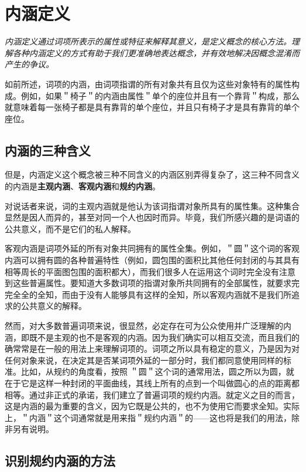 \section{内涵定义}

\begin{logicbox}[title=引言]
\textit{内涵定义通过词项所表示的属性或特征来解释其意义，是定义概念的核心方法。理解各种内涵定义的方式有助于我们更准确地表达概念，并有效地解决因概念混淆而产生的争议。}
\end{logicbox}

如前所述，词项的内涵，由词项指谓的所有对象共有且仅为这些对象特有的属性构成。例如，如果＂椅子＂的内涵由属性＂单个的座位并且有一个靠背＂构成，那么就意味着每一张椅子都是具有靠背的单个座位，并且只有椅子才是具有靠背的单个座位。

\subsection{内涵的三种含义}

但是，内涵定义这个概念被三种不同含义的内涵区别弄得复杂了，这三种不同含义的内涵是\textbf{主观内涵}、\textbf{客观内涵}和\textbf{规约内涵}。

对说话者来说，词的主观内涵就是他认为该词指谓对象所具有的属性集。这种集合显然是因人而异的，甚至对同一个人也因时而异。毕竟，我们所感兴趣的是词语的公共意义，而不是它们的私人解释。

客观内涵是词项外延的所有对象共同拥有的属性全集。例如，＂圆＂这个词的客观内涵可以拥有圆的各种普遍特性（例如，圆包围的面积比其他任何封闭的与其具有相等周长的平面图包围的面积都大），而我们很多人在运用这个词时完全没有注意到这些普遍属性。要知道大多数词项的指谓对象所共同拥有的全部属性，就要求完完全全的全知，而由于没有人能够具有这样的全知，所以客观内涵就不是我们所追求的公共意义的解释。

然而，对大多数普遍词项来说，很显然，必定存在可为公众使用并广泛理解的内涵，即既不是主观的也不是客观的内涵。因为我们确实可以相互交流，而且我们的确常常是在一般的用法上来理解词项的。词项之所以具有稳定的意义，乃是因为对任何对象来说，在决定其是否某词项外延的一部分时，我们都同意使用同样的标准。比如，从规约的角度看，按照 ＂圆＂这个词的通常用法，圆之所以为圆，就在于它是这样一种封闭的平面曲线，其线上所有的点到一个叫做圆心的点的距离都相等。通过非正式的承诺，我们建立了普遍词项的规约内涵。就定义之目的而言，这是内涵的最为重要的含义，因为它既是公共的，也不为使用它而要求全知。实际上，＂内涵＂这个词通常就是用来指＂规约内涵＂的——这也将是我们的用法，除非另有说明。

\subsection{识别规约内涵的方法}


